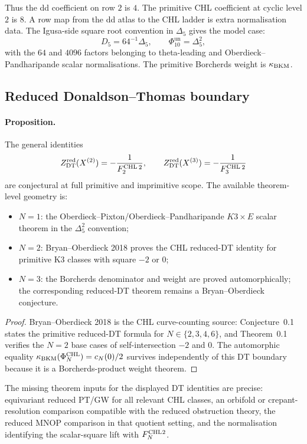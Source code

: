 Thus the dd coefficient on row \(2\) is \(4\).  The primitive CHL
coefficient at cyclic level \(2\) is \(8\).  A row map from the dd atlas
to the CHL ladder is extra normalisation data.  The Igusa-side square
root convention in \(\Delta_5\) gives the model case:
\[
  D_5=64^{-1}\Delta_5,\qquad
  \Phi_{10}^{\mathrm{un}}=\Delta_5^2,
\]
with the \(64\) and \(4096\) factors belonging to theta-leading and
Oberdieck--Pandharipande scalar normalisations.  The primitive
Borcherds weight is \(\kappa_{\mathrm{BKM}}\).

\subsection*{Reduced Donaldson--Thomas boundary}

\paragraph{Proposition.}
The general identities
\[
  Z^{\mathrm{red}}_{\mathrm{DT}}(X^{(2)})=-\frac{1}{F^{\mathrm{CHL}}_2{}^{\,2}},
  \qquad
  Z^{\mathrm{red}}_{\mathrm{DT}}(X^{(3)})=-\frac{1}{F^{\mathrm{CHL}}_3{}^{\,2}}
\]
are conjectural at full primitive and imprimitive scope.  The available
theorem-level geometry is:
\begin{itemize}
\item \(N=1\): the Oberdieck--Pixton/Oberdieck--Pandharipande
  \(K3\times E\) scalar theorem in the \(\Delta_5^2\) convention;
\item \(N=2\): Bryan--Oberdieck 2018 proves the CHL reduced-DT identity
  for primitive K3 classes with square \(-2\) or \(0\);
\item \(N=3\): the Borcherds denominator and weight are proved
  automorphically; the corresponding reduced-DT theorem remains a
  Bryan--Oberdieck conjecture.
\end{itemize}

\begin{proof}
Bryan--Oberdieck 2018 is the CHL curve-counting source:
Conjecture~0.1 states the primitive reduced-DT formula for
\(N\in\{2,3,4,6\}\), and Theorem~0.1 verifies the \(N=2\) base cases of
self-intersection \(-2\) and \(0\).  The automorphic equality
\(\kappa_{\mathrm{BKM}}(\Phi^{\mathrm{CHL}}_N)=c_N(0)/2\) survives independently of this DT
boundary because it is a Borcherds-product weight theorem.
\end{proof}

The missing theorem inputs for the displayed DT identities are precise:
equivariant reduced PT/GW for all relevant CHL classes, an orbifold or
crepant-resolution comparison compatible with the reduced obstruction
theory, the reduced MNOP comparison in that quotient setting, and the
normalisation identifying the scalar-square lift with \(F^{\mathrm{CHL}}_N{}^2\).

